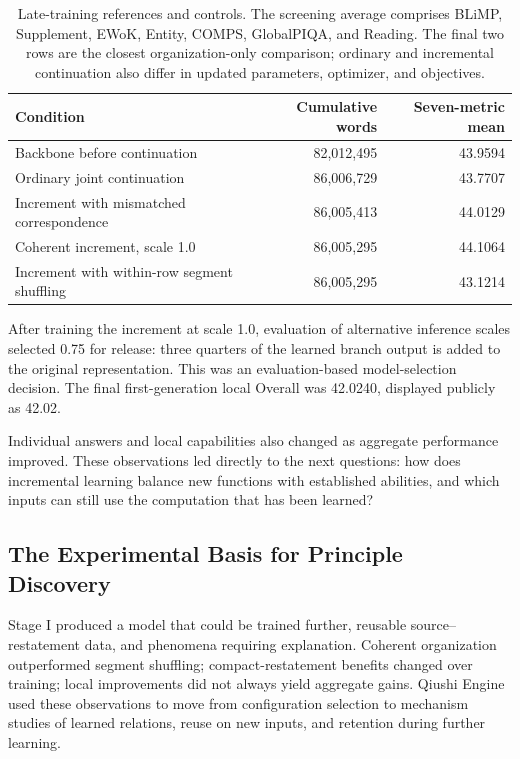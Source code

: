 \begin{table}[htbp]
\caption{Late-training references and controls. The screening average comprises BLiMP, Supplement, EWoK, Entity, COMPS, GlobalPIQA, and Reading. The final two rows are the closest organization-only comparison; ordinary and incremental continuation also differ in updated parameters, optimizer, and objectives.}
\label{tab:late}
\small
\begin{tabularx}{\linewidth}{@{}Yrr@{}}
\toprule Condition & Cumulative words & Seven-metric mean\\\midrule
Backbone before continuation & 82,012,495 & 43.9594\\
Ordinary joint continuation & 86,006,729 & 43.7707\\
Increment with mismatched correspondence & 86,005,413 & 44.0129\\
Coherent increment, scale 1.0 & 86,005,295 & 44.1064\\
Increment with within-row segment shuffling & 86,005,295 & 43.1214\\
\bottomrule
\end{tabularx}
\end{table}

After training the increment at scale 1.0, evaluation of alternative inference scales selected 0.75 for release: three quarters of the learned branch output is added to the original representation. This was an evaluation-based model-selection decision. The final first-generation local Overall was 42.0240, displayed publicly as 42.02.

Individual answers and local capabilities also changed as aggregate performance improved. These observations led directly to the next questions: how does incremental learning balance new functions with established abilities, and which inputs can still use the computation that has been learned?

\subsection{The Experimental Basis for Principle Discovery}

Stage I produced a model that could be trained further, reusable source--restatement data, and phenomena requiring explanation. Coherent organization outperformed segment shuffling; compact-restatement benefits changed over training; local improvements did not always yield aggregate gains. Qiushi Engine used these observations to move from configuration selection to mechanism studies of learned relations, reuse on new inputs, and retention during further learning.
